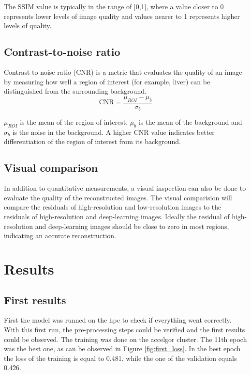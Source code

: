 \documentclass[twocolumn]{article}
\begin{document}
 The SSIM value is typically in the range of [0,1], where a value closer to 0 represents lower levels of image quality and values nearer to 1 represents higher levels of quality. \cite{dosselmann-2009}

 \subsection{Contrast-to-noise ratio}
 Contrast-to-noise ratio (CNR) is a metric that evaluates the quality of an image by measuring how well a region of interest (for example, liver) can be distinguished from the surrounding background.
\begin{equation}\label{CNR}
\text{CNR}=\frac{\mu_{ROI}-\mu_b}{\sigma_b}
\end{equation}

$\mu_{ROI}$ is the mean of the region of interest, $\mu_b$ is the mean of the background and $\sigma_b$ is the noise in the background.
A higher CNR value indicates better differentiation of the region of interest from its background.

\subsection{Visual comparison}
In addition to quantitative measurements, a visual inspection can also be done to evaluate the quality of the reconstructed images. 
The visual comparision will compare the residuals of high-resolution and low-resolution images to the residuals of high-resolution and deep-learning images. 
Ideally the residual of high-resolution and deep-learning images should be close to zero in most regions, indicating an accurate reconstruction. 

\section{Results}
\subsection{First results}
First the model was runned on the hpc to check if everything went correctly. 
With this first run, the pre-processing steps could be verified and the first results could be observed. 
The training was done on the accelgor cluster. 
The 11th epoch was the best one, as can be observed in Figure \ref{fig:first_loss}.
In the best epoch the loss of the training is equal to 0.481, while the one of the validation equals 0.426.
\end{document}
